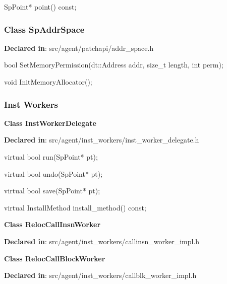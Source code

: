 \begin{apient}
SpPoint* point() const;
\end{apient}
\apidesc{
}


\subsubsection{Class SpAddrSpace}
\textbf{Declared in}: src/agent/patchapi/addr\_space.h

\begin{apient}
bool SetMemoryPermission(dt::Address addr,
                         size_t length,
                         int perm);
\end{apient}
\apidesc{
}

\begin{apient}
void InitMemoryAllocator();
\end{apient}
\apidesc{
}

\subsubsection{Inst Workers}

\textbf{Class InstWorkerDelegate}

\textbf{Declared in}: src/agent/inst\_workers/inst\_worker\_delegate.h

\begin{apient}
virtual bool run(SpPoint* pt);
\end{apient}

\begin{apient}
virtual bool undo(SpPoint* pt);
\end{apient}

\begin{apient}
virtual bool save(SpPoint* pt);
\end{apient}

\begin{apient}
virtual InstallMethod install_method() const;
\end{apient}

\textbf{Class RelocCallInsnWorker}

\textbf{Declared in}: src/agent/inst\_workers/callinsn\_worker\_impl.h

\textbf{Class RelocCallBlockWorker}

\textbf{Declared in}: src/agent/inst\_workers/callblk\_worker\_impl.h


